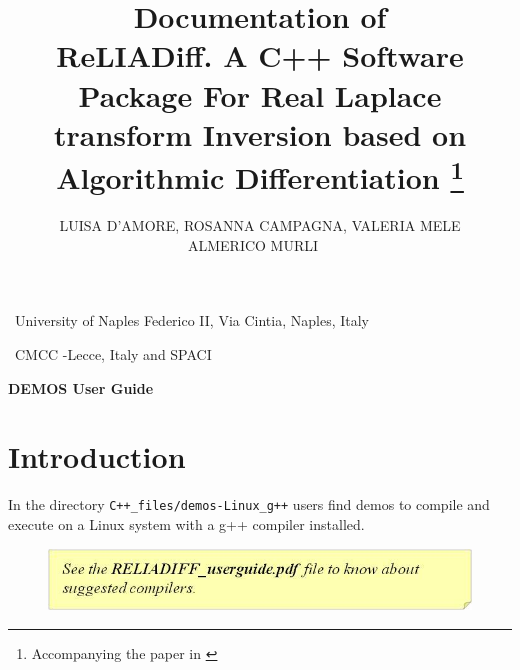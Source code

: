 \documentclass[10pt]{article}
\title{Documentation of  \\ReLIADiff. A C++ Software Package For Real Laplace
transform Inversion based on Algorithmic Differentiation
\footnote{Accompanying the paper in \cite{RELART}} }
\date{}
\begin{document}
\maketitle
\thispagestyle{empty}

\author{
\begin{center} LUISA D'AMORE\dag , ROSANNA CAMPAGNA\dag, VALERIA MELE\dag \\ ALMERICO MURLI\ddag \,  \

\end{center}}

{\dag\ University of Naples Federico II, Via Cintia,  Naples, Italy}


{\ddag\ CMCC -Lecce, Italy and SPACI}

\vspace{2cm}
\begin{center}
 {\large {\bf DEMOS User Guide  }}
\end{center}
\vspace{2cm}

\setlength{\parindent}{0in}


\newcommand{\itab}[1]{\hspace{0em}\rlap{#1}}
\newcommand{\tab}[1]{\hspace{.3\textwidth}\rlap{#1}}

\newpage
\setcounter{page}{1}
\tableofcontents

\newpage

\section{Introduction}\label{intro}

In the directory {\tt C++\_files/demos-Linux\_g++} users find demos to compile and execute on a Linux system with a g++ compiler installed.\\


\begin{figure}[!h]
\begin{flushright}
\includegraphics[scale=0.8]{Immagine1}
\end{flushright}
\end{figure}
\end{document}
